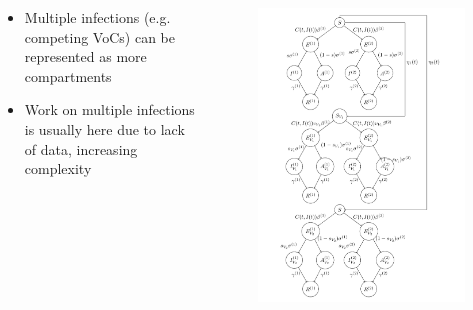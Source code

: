 \documentclass{beamer}
\begin{document}
\begin{frame}
    \begin{columns}
        \begin{column}{0.6\textwidth}

            \begin{itemize}
                \item Multiple infections (e.g. competing VoCs) can be represented as more compartments
                \item Work on multiple infections is usually here due to lack of data, increasing complexity
            \end{itemize}
    
\end{column}


    \begin{column}{0.4\textwidth}

\begin{figure}[h!]
    \centering
    \includegraphics[width=\textwidth]{voc_model_diagram.png}
\label{model_structure}
\end{figure}
\end{column}
\end{columns}
\end{frame}
\end{document}
